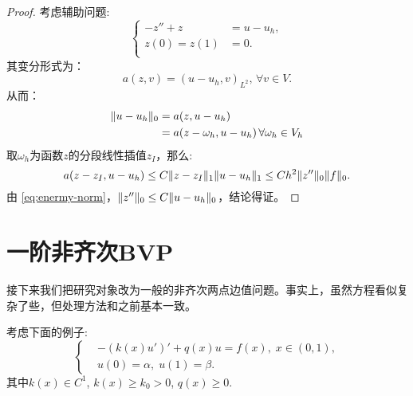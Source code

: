 \begin{proof}
  考虑辅助问题:
  \begin{equation}
    \label{eq:auxiliaryProb}
    \left\{
    \begin{aligned}
        -z''+z&=u-u_{h},\\
        z(0)=z(1)&=0.\\
    \end{aligned}
    \right.
  \end{equation}
  其变分形式为：
  \begin{equation}
    a(z,v)=(u-u_{h},v)_{L^{2}},\,\forall v\in V.
  \end{equation}
  从而：
  \begin{equation}
    \begin{aligned}
      \|u-u_{h}\|_{0}&=a(z,u-u_{h})\\
      &=a(z-\omega_{h},u-u_{h})\,\forall\omega_{h}\in V_{h}\\
    \end{aligned}
  \end{equation}
  取$\omega_{h}$为函数$z$的分段线性插值$z_{I}$，那么:
  \begin{equation}
    a(z-z_{I},u-u_{h})\le C\|z-z_{I}\|_{1}\|u-u_{h}\|_{1}\le Ch^{2}\|z''\|_{0}\|f\|_{0}.
  \end{equation}
  由 \eqref{eq:enermy-norm}，$\|z''\|_{0}\le C\|u-u_{h}\|_{0}$，结论得证。
\end{proof}
\section{一阶非齐次BVP}
接下来我们把研究对象改为一般的非齐次两点边值问题。事实上，虽然方程看似复杂了些，但处理方法和之前基本一致。

考虑下面的例子:
\begin{equation}
  \label{eq:unhomobvp}
  \left\{
    \begin{aligned}
      &-(k(x)u')'+q(x)u=f(x),\;x\in(0,1),\\
      &u(0)=\alpha,\; u(1)=\beta.
    \end{aligned}
  \right.
\end{equation}
其中$k(x)\in C^{1}$, $k(x)\ge k_{0}>0$, $q(x)\ge 0$.

